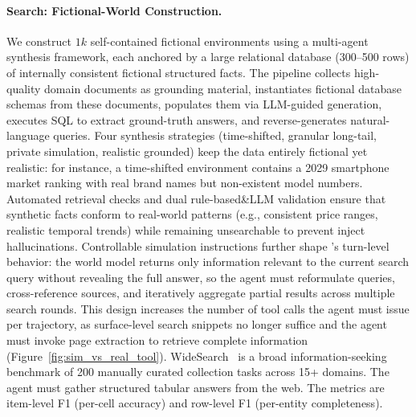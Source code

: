 \paragraph{Search: Fictional-World Construction.}
We construct $1k$ self-contained fictional environments using a multi-agent synthesis framework, each anchored by a large relational database (300--500 rows) of internally consistent fictional structured facts.
The pipeline collects high-quality domain documents as grounding material, instantiates fictional database schemas from these documents, populates them via LLM-guided generation, executes SQL to extract ground-truth answers, and reverse-generates natural-language queries.
Four synthesis strategies (time-shifted, granular long-tail, private simulation, realistic grounded) keep the data entirely fictional yet realistic: for instance, a time-shifted environment contains a 2029 smartphone market ranking with real brand names but non-existent model numbers.
Automated retrieval checks and dual rule-based\&LLM validation ensure that synthetic facts conform to real-world patterns (e.g., consistent price ranges, realistic temporal trends) while remaining unsearchable to prevent inject hallucinations.
Controllable simulation instructions further shape \method's turn-level behavior: the world model returns only information relevant to the current search query without revealing the full answer, so the agent must reformulate queries, cross-reference sources, and iteratively aggregate partial results across multiple search rounds.
This design increases the number of tool calls the agent must issue per trajectory, as surface-level search snippets no longer suffice and the agent must invoke page extraction to retrieve complete information (Figure~\ref{fig:sim_vs_real_tool}).
WideSearch~\citep{wong2025widesearch} is a broad information-seeking benchmark of 200 manually curated collection tasks across 15+ domains.
The agent must gather structured tabular answers from the web. The metrics are item-level F1 (per-cell accuracy) and row-level F1 (per-entity completeness).

